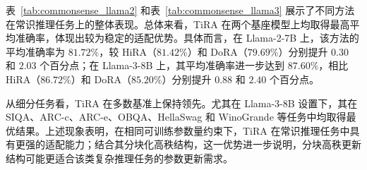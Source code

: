 ﻿\documentclass[UTF8,a4paper,11pt]{ctexart}
\begin{document}
\begin{table}[H]
\centering
\caption{以 Llama-3-8B 为基座模型时，各参数高效微调方法在常识推理数据集上的准确率对比。除 TiRA 外，其余基线结果引自 HiRA。最优结果以粗体标示，次优结果以下划线标示。}
\label{tab:commonsense_llama3}
\setlength{\tabcolsep}{3pt}
\end{table}

表~\ref{tab:commonsense_llama2} 和表~\ref{tab:commonsense_llama3} 展示了不同方法在常识推理任务上的整体表现。总体来看，TiRA 在两个基座模型上均取得最高平均准确率，体现出较为稳定的适配优势。具体而言，在 Llama-2-7B 上，该方法的平均准确率为 $81.72\%$，较 HiRA（$81.42\%$）和 DoRA（$79.69\%$）分别提升 $0.30$ 和 $2.03$ 个百分点；在 Llama-3-8B 上，其平均准确率进一步达到 $87.60\%$，相比 HiRA（$86.72\%$）和 DoRA（$85.20\%$）分别提升 $0.88$ 和 $2.40$ 个百分点。

从细分任务看，TiRA 在多数基准上保持领先。尤其在 Llama-3-8B 设置下，其在 SIQA、ARC-c、ARC-e、OBQA、HellaSwag 和 WinoGrande 等任务中均取得最优结果。上述现象表明，在相同可训练参数量约束下，TiRA 在常识推理任务中具有更强的适配能力；结合其分块化高秩结构，这一优势进一步说明，分块高秩更新结构可能更适合该类复杂推理任务的参数更新需求。
\end{document}
